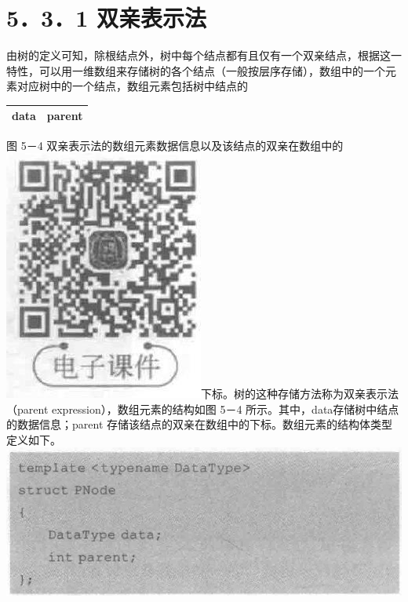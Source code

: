 \documentclass[10pt]{article}
\begin{document}
\section*{5．3．1 双亲表示法}
由树的定义可知，除根结点外，树中每个结点都有且仅有一个双亲结点，根据这一特性，可以用一维数组来存储树的各个结点（一般按层序存储），数组中的一个元素对应树中的一个结点，数组元素包括树中结点的

\begin{center}
\begin{tabular}{|c|c|}
\hline
data & parent \\
\hline
\end{tabular}
\end{center}

图 5－4 双亲表示法的数组元素数据信息以及该结点的双亲在数组中的\\
\includegraphics[max width=\textwidth]{2025_06_06_704745ea57b15b2333e5g-145(1)}下标。树的这种存储方法称为双亲表示法（parent expression），数组元素的结构如图 5－4 所示。其中，data存储树中结点的数据信息；parent 存储该结点的双亲在数组中的下标。数组元素的结构体类型定义如下。\\
\includegraphics[max width=\textwidth, center]{2025_06_06_704745ea57b15b2333e5g-145(2)}
\end{document}
